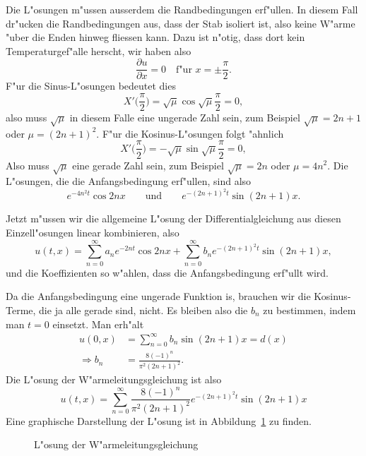 \begin{loesung}
Die L"osungen m"ussen ausserdem die Randbedingungen erf"ullen.
In diesem Fall dr"ucken die Randbedingungen aus, dass der Stab isoliert ist,
also keine W"arme "uber die Enden hinweg fliessen kann. Dazu ist n"otig,
dass dort kein Temperaturgef"alle herscht, wir haben also
\[\frac{\partial u}{\partial x}=0\quad\text{f"ur $x=\pm\frac{\pi}2$}.\]
F"ur die Sinus-L"osungen bedeutet dies
\[
X'\biggl(\frac{\pi}2\biggr)=\sqrt{\mu}\cos \sqrt{\mu}\frac{\pi}2=0,
\]
also muss $\sqrt{\mu}$ in diesem Falle eine ungerade Zahl sein,
zum Beispiel $\sqrt{\mu}=2n+1$ oder
$\mu=(2n+1)^2$.
F"ur die Kosinus-L"osungen folgt "ahnlich
\[
X'\biggl(\frac{\pi}2\biggr)=-\sqrt{\mu}\sin\sqrt{\mu}\frac{\pi}2=0,
\]
Also muss $\sqrt{\mu}$ eine gerade Zahl sein, zum Beispiel $\sqrt{\mu}=2n$ oder
$\mu=4n^2$.
Die L"osungen, die die Anfangsbedingung
erf"ullen, sind also
\[
e^{-4n^2t}\cos 2nx\qquad\text{und}\qquad e^{-(2n+1)^2t}\sin(2n+1)x.
\]

Jetzt m"ussen wir die allgemeine L"osung der Differentialgleichung aus
diesen Einzell"osungen linear kombinieren, also
\[
u(t,x)=
\sum_{n=0}^\infty a_ne^{-2nt}\cos 2nx +\sum_{n=0}^\infty b_n e^{-(2n+1)^2t}\sin(2n+1)x,
\]
und die Koeffizienten so w"ahlen, dass die Anfangsbedingung erf"ullt wird.

Da die Anfangsbedingung eine ungerade Funktion is, brauchen wir die Kosinus-Terme,
die ja alle gerade sind, nicht. Es bleiben also die $b_n$ zu bestimmen, indem
man $t=0$ einsetzt. Man erh"alt
\begin{align*}
u(0,x)&=\sum_{n=0}^\infty b_n\sin(2n+1)x=d(x)
\\
\Rightarrow
b_n&=\frac{8(-1)^n}{\pi^2(2n+1)^2}.
\end{align*}
Die L"osung der W"armeleitungsgleichung ist also
\[
u(t,x)=
\sum_{n=0}^\infty \frac{8(-1)^n}{\pi^2(2n+1)^2}e^{-(2n+1)^2t}\sin(2n+1)x
\]
Eine graphische Darstellung der L"osung ist in Abbildung~\ref{40000005:bild}
zu finden.
\begin{figure}
\begin{center}
\end{center}
\caption{L"osung der W"armeleitungsgleichung\label{40000005:bild}}
\end{figure}
\end{loesung}
